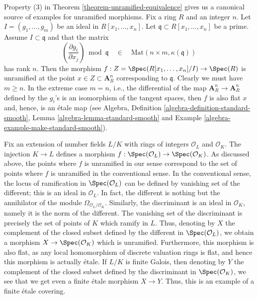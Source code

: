 \begin{example}
\label{example-standard-etale}
Property (3) in
Theorem \ref{theorem-unramified-equivalence}
gives us a canonical source of examples for unramified morphisms.
Fix a ring $R$ and an integer $n$. Let $I = (g_1, \ldots, g_m)$ be an
ideal in $R[x_1, \ldots, x_n]$. Let $\mathfrak q \subset R[x_1, \ldots, x_n]$
be a prime. Assume $I \subset \mathfrak q$ and that the matrix
$$
\left(\frac{\partial g_i}{\partial x_j}\right) \bmod \mathfrak q
\quad\in\quad
\text{Mat}(n \times m, \kappa(\mathfrak q))
$$
has rank $n$. Then the morphism
$f : Z = \Spec(R[x_1, \ldots, x_n]/I) \to \Spec(R)$
is unramified at the point $x \in Z \subset \mathbf{A}^n_R$ corresponding
to $\mathfrak q$. Clearly we must have $m \geq n$.
In the extreme case $m = n$, i.e., the differential of the map
$\mathbf{A}^n_R \to \mathbf{A}^n_R$ defined by the $g_i$'s
is an isomorphism of the tangent spaces, then $f$ is also flat
$x$ and, hence, is an \'etale map (see Algebra,
Definition \ref{algebra-definition-standard-smooth},
Lemma \ref{algebra-lemma-standard-smooth} and
Example \ref{algebra-example-make-standard-smooth}).
\end{example}

\begin{example}
\label{example-number-theory-etale}
Fix an extension of number fields $L/K$ with rings of integers
$\mathcal{O}_L$ and $\mathcal{O}_K$. The injection $K \to L$ defines a
morphism $f : \Spec(\mathcal{O}_L) \to \Spec(\mathcal{O}_K)$.
As discussed above, the points where $f$ is unramified in our sense
correspond to the set of points where $f$ is unramified in the conventional
sense. In the conventional sense, the locus of ramification in
$\Spec(\mathcal{O}_L)$ can be defined by vanishing set of the
different; this is an ideal in $\mathcal{O}_L$. In fact, the different is
nothing but the annihilator of the module
$\Omega_{\mathcal{O}_L/\mathcal{O}_K}$. Similarly, the
discriminant is an ideal in $\mathcal{O}_K$, namely it is the
norm of the different.
The vanishing set of the discriminant is precisely the set
of points of $K$ which ramify in $L$.
Thus, denoting by $X$ the complement of the closed subset
defined by the different in $\Spec(\mathcal{O}_L)$,
we obtain a morphism $X \to \Spec(\mathcal{O}_K)$ which is unramified.
Furthermore, this morphism is also flat, as any local homomorphism
of discrete valuation rings is flat, and hence this morphism is
actually \'etale. If $L/K$ is finite Galois, then denoting by
$Y$ the complement of the closed subset defined by the discriminant in
$\Spec(\mathcal{O}_K)$, we see that we get even a
finite \'etale morphism $X \to Y$.
Thus, this is an example of a finite \'etale covering.
\end{example}





